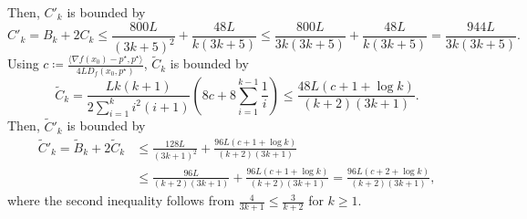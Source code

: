 \documentclass[11pt,a4paper]{article}
\theoremstyle{definition}
\theoremstyle{plain}
\begin{document}
    Then, $C'_k$ is bounded by
    \[
        C'_k = B_k + 2C_k \le \frac{800L}{(3k + 5)^2} + \frac{48L}{k(3k + 5)} \le \frac{800L}{3k(3k + 5)} + \frac{48L}{k(3k + 5)} = \frac{944L}{3k(3k + 5)}.
    \]
    Using $c \coloneqq \frac{\langle\nabla f(x_0) - p^\star, p^\star\rangle}{4LD_f(x_0, p^\star)}$, $\tilde C_k$ is bounded by
    \[
        \tilde C_k = \frac{Lk(k + 1)}{2\sum_{i = 1}^ki^2(i + 1)}\left(8c + 8\sum_{i = 1}^{k - 1}\frac1i\right) \le \frac{48L(c + 1 + \log k)}{(k + 2)(3k + 1)}.
    \]
    Then, $\tilde C'_k$ is bounded by
    \begin{align*}
        \tilde C'_k = \tilde B_k +2\tilde C_k
        &\le \frac{128L}{(3k + 1)^2} + \frac{96L(c + 1 + \log k)}{(k + 2)(3k + 1)}\\
        &\le \frac{96L}{(k + 2)(3k + 1)} + \frac{96L(c + 1 +\log k)}{(k + 2)(3k + 1)} = \frac{96L(c + 2 + \log k)}{(k + 2)(3k + 1)},
    \end{align*}
    where the second inequality follows from $\frac4{3k + 1} \le \frac3{k + 2}$ for $k \ge 1$.
\end{document}
